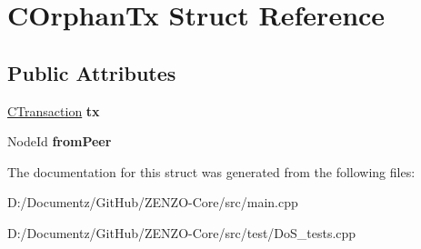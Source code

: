 \hypertarget{struct_c_orphan_tx}{}\section{C\+Orphan\+Tx Struct Reference}
\label{struct_c_orphan_tx}
\subsection*{Public Attributes}
\begin{DoxyCompactItemize}
\item 
\mbox{\label{struct_c_orphan_tx_aa797568f3a1168e96d3c51601eda5fdc}} 
\mbox{\hyperlink{class_c_transaction}{C\+Transaction}} {\bfseries tx}
\item 
\mbox{\label{struct_c_orphan_tx_a06fa313a474fd4e6d0ed20bda7cbe69c}} 
Node\+Id {\bfseries from\+Peer}
\end{DoxyCompactItemize}


The documentation for this struct was generated from the following files\+:\begin{DoxyCompactItemize}
\item 
D\+:/\+Documentz/\+Git\+Hub/\+Z\+E\+N\+Z\+O-\/\+Core/src/main.\+cpp\item 
D\+:/\+Documentz/\+Git\+Hub/\+Z\+E\+N\+Z\+O-\/\+Core/src/test/Do\+S\+\_\+tests.\+cpp\end{DoxyCompactItemize}
